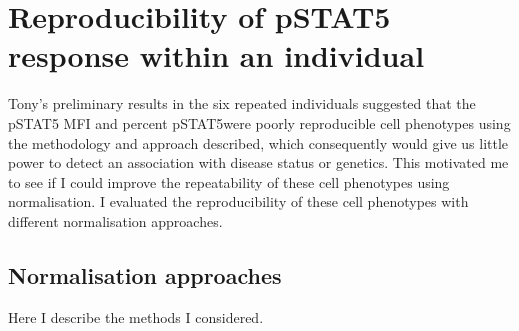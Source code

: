 \section{Reproducibility of pSTAT5 response within an individual}

Tony's preliminary results in the six repeated individuals suggested that the pSTAT5 MFI and percent pSTAT5\positive were poorly reproducible
cell phenotypes using the methodology and approach described, which consequently would give us little power to detect an association with disease status or genetics.
This motivated me to see if I could improve the repeatability of these cell phenotypes using normalisation.
I evaluated the reproducibility of these cell phenotypes with different normalisation approaches.

\subsection{Normalisation approaches}

Here I describe the methods I considered.

